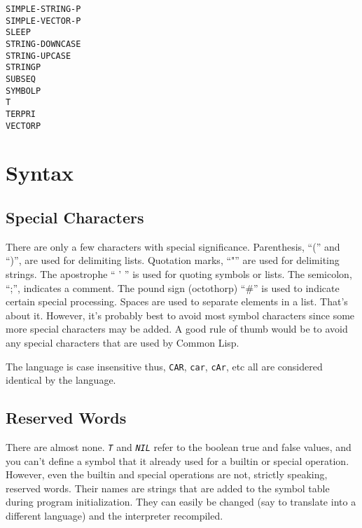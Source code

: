 \documentclass[10pt, openany]{book}
\newcommand{\function}[1]{\texttt{#1}}
\newcommand{\constant}[1]{\emph{\texttt{#1}}}
\newcommand{\keyword}[1]{\texttt{#1}}
\newcommand{\cl}{Common Lisp}
\begin{document}
\begin{multicols}{4}
  \keyword{SIMPLE-STRING-P}\\
  \keyword{SIMPLE-VECTOR-P}\\
  \keyword{SLEEP}\\
  \keyword{STRING-DOWNCASE}\\
  \keyword{STRING-UPCASE}\\
  \keyword{STRINGP}\\
  \keyword{SUBSEQ}\\
  \keyword{SYMBOLP}\\
  \keyword{T}\\
  \keyword{TERPRI}\\
  \keyword{VECTORP}\\
\end{multicols}

\section{Syntax}

\subsection{Special Characters}
There are only a few characters with special significance.  Parenthesis, ``('' and ``)'', are used for delimiting lists.  Quotation marks, ``"'' are used for delimiting strings.  The apostrophe `` ' '' is used for quoting symbols or lists.  The semicolon, ``;'', indicates a comment.  The pound sign (octothorp) ``\#'' is used to indicate certain special processing.  Spaces are used to separate elements in a list.  That's about it.  However, it's probably best to avoid most symbol characters since some more special characters may be added.  A good rule of thumb would be to avoid any special characters that are used by \cl.

The language is case insensitive thus, \function{CAR}, \function{car}, \function{cAr}, etc all are considered identical by the language.

\subsection{Reserved Words}
There are almost none.  \constant{T} and \constant{NIL} refer to the boolean true and false values, and you can't define a symbol that it already used for a builtin or special operation.  However, even the builtin and special operations are not, strictly speaking, reserved words.  Their names are strings that are added to the symbol table during program initialization.  They can easily be changed (say to translate into a different language) and the interpreter recompiled.
\end{document}
